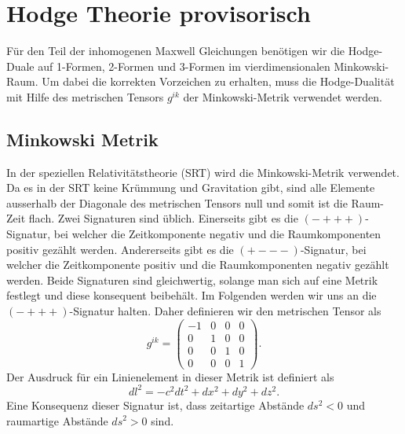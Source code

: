 %
%
%
%
\section{Hodge Theorie provisorisch
\label{maxwell:section:teil1}}

Für den Teil der inhomogenen Maxwell Gleichungen benötigen wir die Hodge-Duale auf 1-Formen, 2-Formen und 3-Formen im vierdimensionalen Minkowski-Raum.
Um dabei die korrekten Vorzeichen zu erhalten, muss die Hodge-Dualität mit Hilfe des metrischen Tensors $g^{ik}$  der Minkowski-Metrik verwendet werden.



\subsection{Minkowski Metrik}
In der speziellen Relativitätstheorie (SRT) wird die Minkowski-Metrik verwendet.
Da es in der SRT keine Krümmung und Gravitation gibt, sind alle Elemente ausserhalb der Diagonale des metrischen Tensors null und somit ist die Raum-Zeit flach.
Zwei Signaturen sind üblich.
Einerseits gibt es die $(-+++)$-Signatur, bei welcher die Zeitkomponente negativ und die Raumkomponenten positiv gezählt werden.
Andererseits gibt es die $(+---)$-Signatur, bei welcher die Zeitkomponente positiv und die Raumkomponenten negativ gezählt werden.
Beide Signaturen sind gleichwertig, solange man sich auf eine Metrik festlegt und diese konsequent beibehält.
Im Folgenden werden wir uns an die $(-+++)$-Signatur halten.
Daher definieren wir den metrischen Tensor als
\begin{equation}
	g^{ik} = \begin{pmatrix}
		-1 & 0 & 0 & 0 \\ 0 & 1 & 0 & 0 \\ 0 & 0 & 1 & 0 \\ 0 & 0 & 0 & 1 
	\end{pmatrix}.
	\label{maxwell:section:teil1:metrik}
\end{equation}
Der Ausdruck für ein Linienelement in dieser Metrik ist definiert als
\begin{equation}
	dl^2 = -c^2dt^2 +dx^2+dy^2+dz^2.
\end{equation}
Eine Konsequenz dieser Signatur ist, dass zeitartige Abstände $ds^2 < 0$ und raumartige Abstände $ds^2 > 0$ sind.


